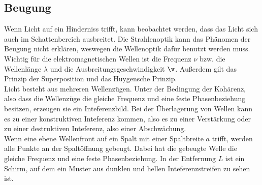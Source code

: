 \subsection{Beugung}
\label{subsec:Beugung}
Wenn Licht auf ein Hinderniss trifft, kann beobachtet werden, dass das Licht sich auch im Schattenbereich ausbreitet.
Die Strahlenoptik kann das Phänomen der Beugung nicht erklären, weswegen die Wellenoptik dafür benutzt werden muss.
Wichtig für die elektromagnetischen Wellen ist die Frequenz $\nu$ bzw. die Wellenlänge $\lambda$ und die Ausbreitungsgeschwindigkeit $\v$.
Außerdem gilt das Prinzip der Superposition und das Huygensche Prinzip.\\
Licht besteht aus mehreren Wellenzügen.
Unter der Bedingung der Kohärenz, also dass die Wellenzüge die gleiche Frequenz und eine feste Phasenbeziehung besitzen, erzeugen sie ein Inteferenzbild.
Bei der Überlagerung von Wellen kann es zu einer konstruktiven Inteferenz kommen, also es zu einer  Verstärkung oder zu einer destruktiven
Inteferenz, also einer Abschwächung.\\
Wenn eine ebene Wellenfront auf ein Spalt mit einer Spaltbreite $a$ trifft, werden alle Punkte an der Spaltöffnung gebeugt.
Dabei hat die gebeugte Welle die gleiche Frequenz und eine feste Phasenbeziehung. 
In der Entfernung $L$ ist ein Schirm, auf dem ein Muster aus dunklen und hellen Inteferenzstreifen zu sehen ist.

